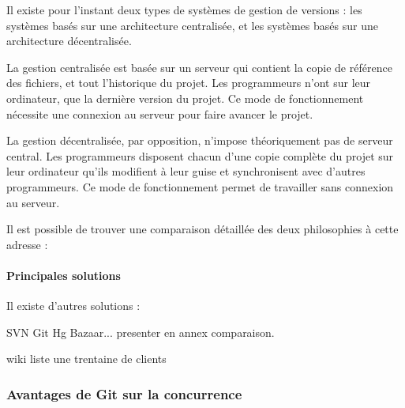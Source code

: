 Il existe pour l'instant deux types de systèmes de gestion de versions : 
les systèmes basés sur une architecture centralisée,
et les systèmes basés sur une architecture décentralisée.

La gestion centralisée est basée sur un serveur qui contient la copie de référence des fichiers, 
et tout l'historique du projet. 
Les programmeurs n'ont sur leur ordinateur, que la dernière version du projet. 
Ce mode de fonctionnement nécessite une connexion au serveur pour faire avancer le projet.

La gestion décentralisée, par opposition, n'impose théoriquement pas de serveur central.
Les programmeurs disposent chacun d'une copie complète du projet sur leur ordinateur
qu'ils modifient à leur guise et synchronisent avec d'autres programmeurs.
Ce mode de fonctionnement permet de travailler sans connexion au serveur.

Il est possible de trouver une comparaison détaillée des deux philosophies à cette adresse :

\paragraph{Principales solutions}

Il existe d'autres solutions :


SVN Git Hg Bazaar...
presenter en annex comparaison.

wiki liste une trentaine de clients



\subsubsection{Avantages de Git sur la concurrence}

